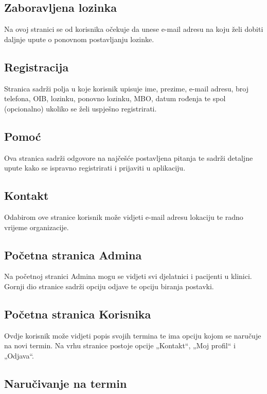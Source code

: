 \subsection{Zaboravljena lozinka}

Na ovoj stranici se od korisnika očekuje da unese e-mail adresu na koju želi dobiti daljnje upute o ponovnom postavljanju lozinke.

\subsection{Registracija}

Stranica sadrži polja u koje korisnik upisuje ime, prezime, e-mail adresu, broj telefona, OIB, lozinku, ponovno lozinku, MBO, datum rođenja te spol (opcionalno) ukoliko se želi uspješno registrirati.

\subsection{Pomoć}

Ova stranica sadrži odgovore na najčešće postavljena pitanja te sadrži detaljne upute kako se ispravno registrirati i prijaviti u aplikaciju.

\subsection{Kontakt}

Odabirom ove stranice korisnik može vidjeti e-mail adresu lokaciju te radno vrijeme organizacije.

\subsection{Početna stranica Admina}

Na početnoj stranici Admina mogu se vidjeti svi djelatnici i pacijenti u klinici. Gornji dio stranice sadrži opciju odjave te opciju biranja postavki.

\subsection{Početna stranica Korisnika}

Ovdje korisnik može vidjeti popis svojih termina te ima opciju kojom se naručuje na novi termin. Na vrhu stranice postoje opcije „Kontakt“, „Moj profil“ i „Odjava“.

\subsection{Naručivanje na termin}

